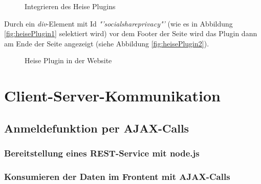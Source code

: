 \begin{figure}[!th]
	\caption{Integrieren des Heise Plugins}
	\label{fig:heisePlugin1}
\end{figure}

Durch ein \textit{div}-Element mit Id \textit{"'socialshareprivacy"'} (wie es in Abbildung \vref{fig:heisePlugin1} selektiert wird) vor dem Footer der Seite wird das Plugin dann am Ende der Seite angezeigt (siehe Abbildung \vref{fig:heisePlugin2}).

\begin{figure}[!bh]
	\caption{Heise Plugin in der Website}
	\label{fig:heisePlugin2}
\end{figure}

\chapter{Client-Server-Kommunikation}
\label{Client-Server-Kommunikation}

\section{Anmeldefunktion per AJAX-Calls}
\label{Anmeldefunktion per AJAX-Calls}

\subsection{Bereitstellung eines REST-Service mit node.js}
\label{Bereitstellung eines REST-Service mit node.js}

\subsection{Konsumieren der Daten im Frontent mit AJAX-Calls}
\label{Konsumieren der Daten im Frontent mit AJAX-Calls}